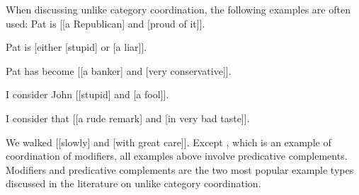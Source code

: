 \documentclass[output=paper]{../langscibook}
\begin{document}
When discussing unlike category coordination, the following examples
are often used:
\ea\label{ex:sag:etal:85:2b} Pat is [[a Republican] and [proud of it]]. \hfill\citep[117, (2b)]{sag:etal:85}
  \item\label{ex:sag:etal:85:2a} Pat is [either [stupid] or [a liar]]. \hfill\citep[117, (2a)]{sag:etal:85}
  \item\label{ex:sag:etal:85:3a} Pat has become [[a banker] and [very conservative]].\\
    \hspace*{\fill} \citep[118, (3a)]{sag:etal:85}
%
  \item I consider John [[stupid] and [a fool]]. \hfill\citep[(35)]{pete:81}
  \item\label{ex:sag:etal:85:3b} I consider that [[a rude remark] and [in very bad taste]].\\ \hspace*{\fill} \citep[118, (3b)]{sag:etal:85}
%
  \item\label{ex:sag:etal:85:57} We walked [[slowly] and [with great care]]. \hfill\citep[140, (57)]{sag:etal:85}
\z
Except , which is an example of coordination
of modifiers, all examples above involve predicative
complements. Modifiers and predicative complements are the two most
popular example types discussed in the literature on unlike category
coordination.
\end{document}

